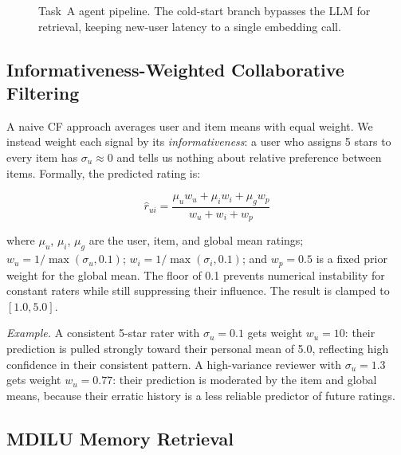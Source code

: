 \documentclass[11pt]{article}
\begin{document}
\begin{figure}[t]
{%
  }
  \caption{Task~A agent pipeline. The cold-start branch bypasses the LLM
    for retrieval, keeping new-user latency to a single embedding call.}
  \label{fig:pipeline_a}
\end{figure}


\subsection{Informativeness-Weighted Collaborative Filtering}
\label{sec:cf}

A naive CF approach averages user and item means with equal weight.
We instead weight each signal by its \textit{informativeness}: a user who
assigns 5 stars to every item has $\sigma_u \approx 0$ and tells us
nothing about relative preference between items.
Formally, the predicted rating is:

\begin{equation}
\hat{r}_{ui}
  = \frac{\mu_u w_u + \mu_i w_i + \mu_g w_p}{w_u + w_i + w_p}
\label{eq:cf}
\end{equation}

where $\mu_u$, $\mu_i$, $\mu_g$ are the user, item, and global mean ratings;
$w_u = 1 / \max(\sigma_u, 0.1)$; $w_i = 1 / \max(\sigma_i, 0.1)$;
and $w_p = 0.5$ is a fixed prior weight for the global mean.
The floor of 0.1 prevents numerical instability for constant raters while
still suppressing their influence.
The result is clamped to $[1.0, 5.0]$.

\smallskip\noindent\textit{Example.}
A consistent 5-star rater with $\sigma_u = 0.1$ gets weight $w_u = 10$:
their prediction is pulled strongly toward their personal mean of 5.0,
reflecting high confidence in their consistent pattern.
A high-variance reviewer with $\sigma_u = 1.3$ gets weight $w_u = 0.77$:
their prediction is moderated by the item and global means, because their
erratic history is a less reliable predictor of future ratings.

\subsection{MDILU Memory Retrieval}
\end{document}
